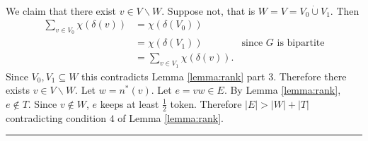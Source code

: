 \documentclass[preprint]{elsarticle}
\newenvironment{proof}{{\bf Proof:  }}{\hfill\rule{2mm}{2mm}}
\begin{document}
\begin{proof}
\paragraph{}
We claim that there exist $v \in V\backslash W$. Suppose not, that is $W = V = V_0 \dot\cup V_1$. Then
\begin{align*}
\sum_{v \in V_0} \chi(\delta(v)) &= \chi(\delta(V_0)) \\
&= \chi(\delta(V_1)) &\text{since $G$ is bipartite} \\
&= \sum_{v \in V_1} \chi(\delta(v)).
\end{align*}
Since $V_0, V_1 \subseteq W$ this contradicts Lemma \ref{lemma:rank} part $3$. Therefore there exists $v \in V \backslash W$. Let $w = n^*(v)$. Let $e = vw \in E$. By Lemma \ref{lemma:rank}, $e \not \in T$. Since $v \not\in W$, $e$ keeps at least $\frac{1}{2}$ token. Therefore $|E| > |W| + |T|$ contradicting condition $4$ of Lemma \ref{lemma:rank}. 
\end{proof}
\end{document}
